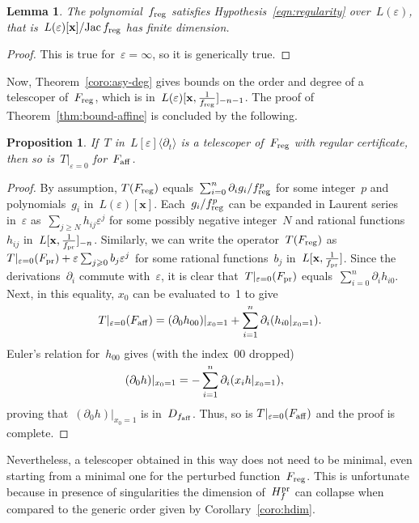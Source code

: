 \documentclass{sig-alternate}
\newtheorem{prop}[thm]{Proposition}
\newtheorem{lem}[thm]{Lemma}
\newcommand{\Lwx}{L(\varepsilon)[\mathbf x]}
\DeclareMathOperator{\Jac}{Jac}
\newcommand{\xx}{\mathbf{x}}
\newcommand{\pr}{{\smash{\mathrm{pr}}}}
\newcommand{\aff}{{\smash{\mathrm{aff}}}}
\newcommand{\reg}{{\smash{\mathrm{reg}}}}
\newcommand{\Hfp}{H_f^{\pr}}
\begin{document}
\begin{lem}
The polynomial~$f_\reg$ satisfies Hypothesis~\eqref{eqn:regularity} over~$L(\varepsilon)$, that is~$\Lwx/\!\Jac f_\reg$ has finite dimension.
\end{lem}
\begin{proof}
This is true for~$\varepsilon=\infty$, so it is generically true. 
\end{proof}
Now, Theorem~\ref{coro:asy-deg} gives bounds on the order and degree of a telescoper of~$F_\reg$, which is in~$L(\varepsilon)[\xx,\tfrac{1}{f_\reg}]_{\smash{-n-1}}$. The proof of Theorem~\ref{thm:bound-affine} is concluded by the following.
\begin{prop}\label{prop:telesc-regtosing}
  If~$T$ in~$L[\varepsilon]\langle \partial_t \rangle$ is a telescoper of~$F_\reg$ with regular certificate, then so is~$T|_{\varepsilon=0}$ for~$F_\aff$.
\end{prop}
\begin{proof}
By assumption, $T(F_\reg)$ equals~$\sum_{i=0}^n\partial_i g_i/f_\reg^p$ for some integer~$p$ and polynomials~$g_i$ in~$\Lwx$.
Each~$g_i/f_\reg^p$ can be expanded in Laurent series in~$\varepsilon$ as~$\sum_{j\geqslant N} h_{ij}\varepsilon^j$ for some possibly negative integer~$N$ and rational functions~$h_{ij}$ in~$L[\xx,\tfrac{1}{f_\pr}]_{-n}$.
Similarly, we can write the operator~$T(F_\reg)$ as~$T|_{\varepsilon=0}(F_\pr)+\varepsilon\sum_{j\geqslant 0} b_j \varepsilon^j$ for some rational functions~$b_j$ in~$L[\xx,\tfrac{1}{f_\pr}]$.
Since the derivations~$\partial_i$ commute with~$\varepsilon$, it is clear that~$T|_{\varepsilon=0}(F_\pr)$ equals~$\sum_{i=0}^n \partial_i h_{i0}$.
Next, in this equality, $x_0$ can be evaluated to~1 to give
\[ T|_{\varepsilon=0}(F_\aff) = (\partial_0 h_{00})|_{x_0=1}+ \sum_{i=1}^{\smash{n}} \partial_i (h_{i0}|_{x_0=1}). \]
Euler's relation for~$h_{00}$ gives (with the index~$00$ dropped)
\begin{align*}
 (\partial_0h)|_{x_0=1}  &= - \sum_{i=1}^{\smash{n}} \partial_i( x_i h|_{x_0=1}),
\end{align*}
proving that~$(\partial_0h)|_{x_0=1}$ is in~$D_{f_\aff}$. Thus, so is $T|_{\varepsilon=0}(F_\aff)$ and the proof is complete.
\end{proof}
Nevertheless, a telescoper obtained in this way does not need to be minimal, even starting from a minimal one for the perturbed function~$F_\reg$.
This is unfortunate because in presence of singularities the dimension of~$\Hfp$ can collapse when compared to the generic order given by Corollary~\ref{coro:hdim}. 
\end{document}
